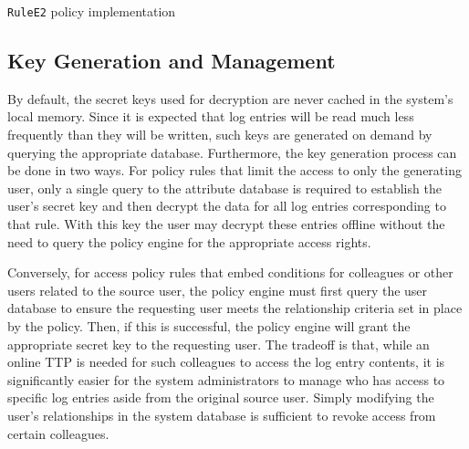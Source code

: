 \documentclass{sig-alternate}
\begin{document}
\begin{algorithm}[t] %
\caption{{\tt RuleE2} policy implementation} \label{alg:ruleE2}
\begin{algorithmic}[1]
\end{algorithmic}
\end{algorithm}

\subsection{Key Generation and Management}
By default, the secret keys used for decryption are never cached in the system's local memory. Since it is
expected that log entries will be read much less frequently than they will be written, such keys are generated
on demand by querying the appropriate database. Furthermore, the key generation process can be done in two ways. 
For policy rules that limit the access to only the generating user, only a single query to the attribute database
is required to establish the user's secret key and then decrypt the data for all log entries corresponding to that rule. With this key
the user may decrypt these entries offline without the need to query the policy engine for the appropriate access rights.

Conversely, for access policy rules that embed conditions for colleagues or other users 
related to the source user, the policy engine must first query the
user database to ensure the requesting user meets the relationship criteria set in place by the policy. Then,
if this is successful, the policy engine will grant the appropriate secret key to the requesting user. The tradeoff
is that, while an online TTP is needed for such colleagues to access the log entry contents, it is significantly easier
for the system administrators to manage who has access to specific log entries aside from the original source user.
Simply modifying the user's relationships in the system database is sufficient to revoke access from certain colleagues.
\end{document}
